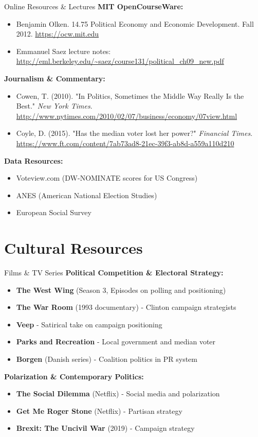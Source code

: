 \documentclass[10pt]{beamer}
\begin{document}
\begin{frame}{Online Resources \& Lectures}
\footnotesize
\textbf{MIT OpenCourseWare:}
\begin{itemize}
\item Benjamin Olken. 14.75 Political Economy and Economic Development. Fall 2012. \url{https://ocw.mit.edu}
\item Emmanuel Saez lecture notes: \url{http://eml.berkeley.edu/~saez/course131/political_ch09_new.pdf}
\end{itemize}


\textbf{Journalism \& Commentary:}
\begin{itemize}
\item Cowen, T. (2010). "In Politics, Sometimes the Middle Way Really Is the Best." \emph{New York Times}. \url{http://www.nytimes.com/2010/02/07/business/economy/07view.html}
\item Coyle, D. (2015). "Has the median voter lost her power?" \emph{Financial Times}. \url{https://www.ft.com/content/7ab73ad8-21ec-39f3-ab8d-a559a110d210}
\end{itemize}


\textbf{Data Resources:}
\begin{itemize}
\item Voteview.com (DW-NOMINATE scores for US Congress)
\item ANES (American National Election Studies)
\item European Social Survey
\end{itemize}
\end{frame}


\section*{Cultural Resources}

\begin{frame}{Films \& TV Series}
\textbf{Political Competition \& Electoral Strategy:}
\begin{itemize}
\item \textbf{The West Wing} (Season 3, Episodes on polling and positioning)
\item \textbf{The War Room} (1993 documentary) - Clinton campaign strategists
\item \textbf{Veep} - Satirical take on campaign positioning
\item \textbf{Parks and Recreation} - Local government and median voter
\item \textbf{Borgen} (Danish series) - Coalition politics in PR system
\end{itemize}


\textbf{Polarization \& Contemporary Politics:}
\begin{itemize}
\item \textbf{The Social Dilemma} (Netflix) - Social media and polarization
\item \textbf{Get Me Roger Stone} (Netflix) - Partisan strategy
\item \textbf{Brexit: The Uncivil War} (2019) - Campaign strategy
\end{itemize}
\end{frame}
\end{document}
